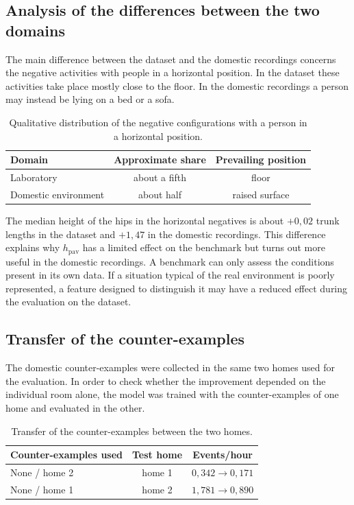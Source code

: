 \subsection{Analysis of the differences between the two domains}

The main difference between the dataset and the domestic recordings concerns the negative activities with people in a horizontal position. In the dataset these activities take place mostly close to the floor. In the domestic recordings a person may instead be lying on a bed or a sofa.

\begin{table}[htbp]
\centering
\caption{Qualitative distribution of the negative configurations with a person in a horizontal position.}
\label{tab:negativi_orizzontali}
\begin{tabular}{lcc}
\toprule
\textbf{Domain} & \textbf{Approximate share} &
\textbf{Prevailing position} \\
\midrule
Laboratory & about a fifth & floor \\
Domestic environment & about half & raised surface \\
\bottomrule
\end{tabular}
\end{table}

The median height of the hips in the horizontal negatives is about $+0{,}02$ trunk lengths in the dataset and $+1{,}47$ in the domestic recordings.
This difference explains why $h_{\text{pav}}$ has a limited effect on the benchmark but turns out more useful in the domestic recordings. A benchmark can only assess the conditions present in its own data. If a situation typical of the real environment is poorly represented, a feature designed to distinguish it may have a reduced effect during the evaluation on the dataset.

\subsection{Transfer of the counter-examples}

The domestic counter-examples were collected in the same two homes used for the evaluation. In order to check whether the improvement depended on the individual room alone, the model was trained with the counter-examples of one home and evaluated in the other.

\begin{table}[ht]
\centering
\caption{Transfer of the counter-examples between the two homes.}
\label{tab:trasferimento_controesempi}
\begin{tabular}{lcc}
\toprule
\textbf{Counter-examples used} &
\textbf{Test home} &
\textbf{Events/hour} \\
\midrule
None / home 2 & home 1 & $0{,}342 \rightarrow 0{,}171$ \\
None / home 1 & home 2 & $1{,}781 \rightarrow 0{,}890$ \\
\bottomrule
\end{tabular}
\end{table}

